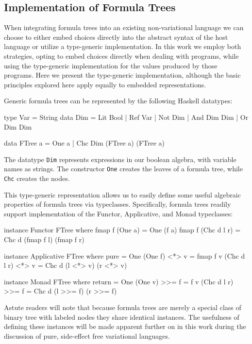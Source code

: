 \documentclass[letterpaper,10pt,onecolumn]{article}
\newcommand{\prog}[1]{{\small\texttt{#1}}}
\begin{document}
\subsection{Implementation of Formula Trees}

When integrating formula trees into an existing non-variational language we can choose to
either embed choices directly into the abstract syntax of the host language or utilize a type-generic
implementation. In this work we employ both strategies, opting to embed choices directly when dealing
with programs, while using the type-generic implementation for the values produced by those programs.
Here we present the type-generic implementation, although the basic principles explored here apply
equally to embedded representations.

Generic formula trees can be represented by the following Haskell datatypes:

\begin{program}
type Var = String
data Dim =
    Lit Bool
  | Ref Var
  | Not Dim
  | And Dim Dim
  | Or Dim Dim

data FTree a = One a | Chc Dim (FTree a) (FTree a) 
\end{program}

The datatype \prog{Dim} represents expressions in our boolean algebra, with variable names as strings.
The constructor \prog{One} creates the leaves of a formula tree, while \prog{Chc} creates the nodes.

This type-generic representation allows us to easily define some useful algebraic properties of
formula trees via typeclasses. Specifically, formula trees readily support implementation of the
Functor, Applicative, and Monad typeclasses:

\begin{program}
instance Functor FTree where
  fmap f (One a) = One (f a)
  fmap f (Chc d l r) = Chc d (fmap f l) (fmap f r)
  
instance Applicative FTree where
  pure = One
  (One f) <*> v = fmap f v
  (Chc d l r) <*> v = Chc d (l <*> v) (r <*> v)
  
instance Monad FTree where
  return = One
  (One v) >>= f = f v
  (Chc d l r) >>= f = Chc d (l >>= f) (r >>= f)
\end{program}

Astute readers will note that because formula trees are merely a special class of binary tree with
labeled nodes they share identical instances. The usefulness of defining these instances will be made
apparent further on in this work during the discussion of pure, side-effect free variational languages.
\end{document}

